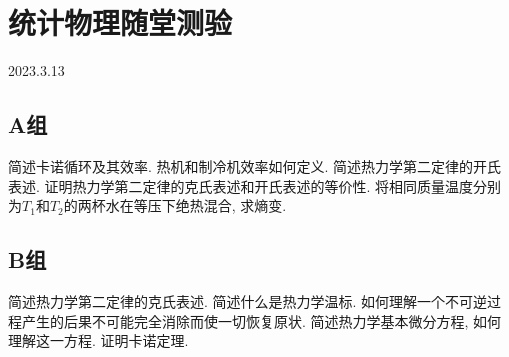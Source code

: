 \section{统计物理随堂测验}
2023.3.13
\subsection{A组}
\begin{questions}
  \question 简述卡诺循环及其效率.
  \question 热机和制冷机效率如何定义.
  \question 简述热力学第二定律的开氏表述.
  \question 证明热力学第二定律的克氏表述和开氏表述的等价性.
  \question 将相同质量温度分别为$T_1$和$T_2$的两杯水在等压下绝热混合, 求熵变.
\end{questions}
\subsection{B组}
\begin{questions}
  \question 简述热力学第二定律的克氏表述.
  \question 简述什么是热力学温标.
  \question 如何理解一个不可逆过程产生的后果不可能完全消除而使一切恢复原状.
  \question 简述热力学基本微分方程, 如何理解这一方程.
  \question 证明卡诺定理.
\end{questions}